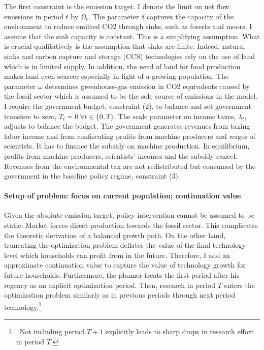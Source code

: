 The first constraint is the emission target. I denote the limit on net flow emissions in period $t$ by $\Omega_t$.  The parameter $\delta$ captures the capacity of the environment to reduce emitted CO2 through sinks, such as forests and moors.  I assume that the sink capacity is constant.  This is a simplifying assumption. What is crucial qualitatively is the assumption that sinks are finite. Indeed, natural sinks and carbon capture and storage (CCS) technologies rely on the use of land \citep{VanVuuren2018AlternativeTechnologies} which is in limited supply. In addition, the need of land for food production makes land even scarcer especially in light of a growing population. The parameter $\omega$ determines greenhouse-gas emission in CO2 equivalents caused by the fossil sector which is assumed to be the sole source of emissions in the model. %
I require the government budget, constraint (2), to balance and set government transfers to zero, $T_t=0\ \forall t\in\{0,T\}$. The scale parameter on income taxes, $\lambda_t$, adjusts to balance the budget.
The government generates revenues from taxing labor income and from confiscating profits from machine producers and wages of scientists. It has to finance the subsidy on machine production. In equilibrium, profits from machine producers, scientists' incomes and the subsidy cancel. 
Revenues from the environmental tax are not redistributed but consumed by the government in the baseline policy regime, constraint (3).

\paragraph{Setup of problem: focus on current population; continuation value}
Given the absolute emission target, policy intervention cannot be assumed to be static. Market forces direct production towards the fossil sector. This complicates the theoretic derivation of a balanced growth path.  On the other hand, truncating the optimization problem deflates the value of the final technology level which households can profit from in the future. Therefore, I add an approximate continuation value to capture the value of technology growth for future households. Furthermore, the planner treats the first period after his regency as an explicit optimization period. Then, research in period $T$ enters the optimization problem similarly as in previous periods through next period technology.\footnote{\ Not including period $T+1$ explicitly leads to sharp drops in research effort in period $T$. }  


